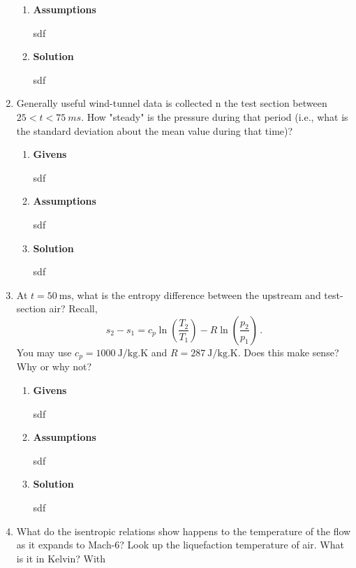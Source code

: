 \documentclass[12pt,letterpaper]{article}
\begin{document}
\begin{enumerate}[label=(\alph*)]
\begin{enumerate}[label=\arabic*.]
			\item{\textbf{Assumptions}}\\
			sdf
			\item{\textbf{Solution}}\\
			sdf
		\end{enumerate}
			\item Generally useful wind-tunnel data is collected n the test section between $25 < t < 75 \  ms$. How "steady" is the pressure during that period (i.e., what is the standard deviation about the mean value during that time)?
		\begin{enumerate}[label=\arabic*.]
			\item{\textbf{Givens}}\\
			sdf
			\item{\textbf{Assumptions}}\\
			sdf
			\item{\textbf{Solution}}\\
			sdf
		\end{enumerate}
			\item At $t=50 \ \unit{\milli\second}$, what is the entropy difference between the upstream and test-section air? Recall,
			\begin{equation*}
				s_2 - s_1 = c_p \ln(\frac{T_2}{T_1}) - R \ln(\frac{p_2}{p_1}) \,.
			\end{equation*}
			You may use $c_p = 1000 \ \unit{\joule/\kilogram.\kelvin}$ and $R = 287 \ \unit{\joule/\kilogram.\kelvin}$. Does this make sense? Why or why not?
		\begin{enumerate}[label=\arabic*.]
			\item{\textbf{Givens}}\\
			sdf
			\item{\textbf{Assumptions}}\\
			sdf
			\item{\textbf{Solution}}\\
			sdf
		\end{enumerate}
			\item What do the isentropic relations show happens to the temperature of the flow as it expands to Mach-6? Look up the liquefaction temperature of air. What is it in Kelvin? With

\end{enumerate}
\end{document}

